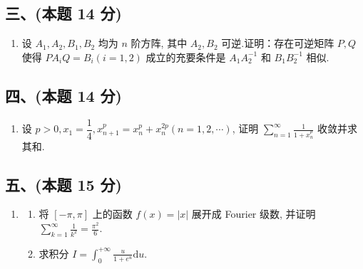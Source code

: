 \subsection*{三、(本题 14 分)}
\begin{enumerate}[start=8]
    \item 设 $A_1, A_2, B_1, B_2$ 均为 $n$ 阶方阵, 其中 $A_2, B_2$ 可逆.证明：存在可逆矩阵 $P, Q$ 使得 $PA_iQ = B_i (i = 1, 2)$ 成立的充要条件是 $A_1A_2^{-1}$ 和 $B_1B_2^{-1}$ 相似.
\end{enumerate}

\subsection*{四、(本题 14 分)}
\begin{enumerate}[start=9]
    \item 设 $p > 0, x_1 = \dfrac{1}{4}, x_{n+1}^p = x_n^p + x_n^{2p} (n = 1, 2, \cdots)$, 证明 $\displaystyle\sum_{n=1}^{\infty} \frac{1}{1 + x_n^p}$ 收敛并求其和.
\end{enumerate}

\subsection*{五、(本题 15 分)}
\begin{enumerate}[start=10]
    \item
          \begin{enumerate}
              \item[(1)] 将 $[-\pi, \pi]$ 上的函数 $f(x) = |x|$ 展开成 Fourier 级数, 并证明
                    $\displaystyle\sum_{k=1}^{\infty} \frac{1}{k^2} = \frac{\pi^2}{6}.$
              \item[(2)] 求积分 $I = \displaystyle\int_{0}^{+\infty} \frac{u}{1 + e^u} \mathrm{d}u$.
          \end{enumerate}
\end{enumerate}

